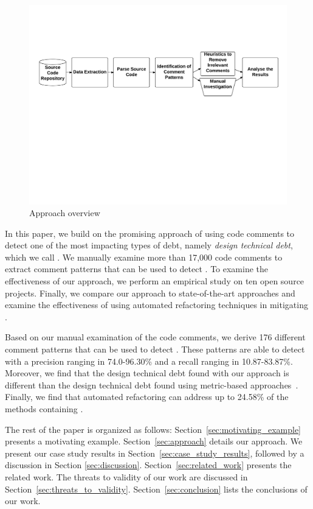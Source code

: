 \begin{figure}[thb!]
    \centering
    \label{fig:approach}
    \includegraphics[width=1\textwidth]{figures/Approach2}
    \vspace{-10mm}
    \caption{Approach overview}
\end{figure}


In this paper, we build on the promising approach of using code comments to detect one of the most impacting types of debt, namely \emph{design technical debt}, which we call \SADTD. We manually examine more than 17,000 code comments to extract comment patterns that can be used to detect \SADTD. To examine the effectiveness of our approach, we perform an empirical study on ten open source projects. Finally, we compare our approach to state-of-the-art approaches and examine the effectiveness of using automated refactoring techniques in mitigating \SADTD.

Based on our manual examination of the code comments, we derive 176 different comment patterns that can be used to detect \SADTD. These patterns are able to detect \SADTD with a precision ranging in 74.0-96.30\% and a recall ranging in 10.87-83.87\%. Moreover, we find that the design technical debt found with our approach is different than the design technical debt found using metric-based approaches~\cite{Zazworka2013CSE}. Finally, we find that automated refactoring can address up to 24.58\% of the methods containing \SADTD.

The rest of the paper is organized as follows:  Section~\ref{sec:motivating_example} presents a motivating example. Section~\ref{sec:approach} details our approach. We present our case study results in Section~\ref{sec:case_study_results}, followed by a discussion in Section \ref{sec:discussion}. Section~\ref{sec:related_work} presents the related work. The threats to validity of our work are discussed in Section~\ref{sec:threats_to_validity}. Section~\ref{sec:conclusion} lists the conclusions of our work.